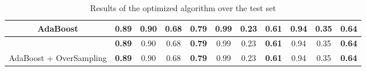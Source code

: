 \documentclass{article}
\begin{document}
\begin{table}[H]
\begin{tabular}{c|c|c|c|c|c|c|c|c|c|c|}
			\multicolumn{1}{|c|}{AdaBoost}                                              & \textbf{0.89}                                                                      & 0.90                                             & 0.68                                             & \textbf{0.79}                                               & 0.99                                             & 0.23                                             & \textbf{0.61}                                               & 0.94                                             & 0.35                                             & \textbf{0.64}                                               \\ \hline
			\rowcolor[HTML]{E6E6E6} 
			\multicolumn{1}{|c|}{\cellcolor[HTML]{E6E6E6}AdaBoost + OverSampling}       & \textbf{0.89}                                                                      & 0.90                                             & 0.68                                             & \textbf{0.79}                                               & 0.99                                             & 0.23                                             & \textbf{0.61}                                               & 0.94                                             & 0.35                                             & \textbf{0.64}                                               \\ \hline
			\multicolumn{1}{|c|}{AdaBoost + OverSampling}                               & \textbf{0.89}                                                                      & 0.90                                             & 0.68                                             & \textbf{0.79}                                               & 0.99                                             & 0.23                                             & \textbf{0.61}                                               & 0.94                                             & 0.35                                             & \textbf{0.64}                                               \\ \hline
		\end{tabular}
		\caption{Results of the optimized algorithm over the test set}
		\label{tab:restest}
	\end{table}
	
	
	
\end{document}
